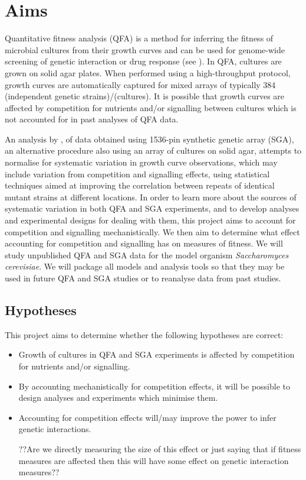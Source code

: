 
\section{Aims}
\label{sec:aims}
Quantitative fitness analysis (QFA) is a method for inferring the
fitness of microbial cultures from their growth curves and can be used
for genome-wide screening of genetic interaction or drug response (see
\citet{Addinall2008,Addinall2011,Lawless2010,Banks2012,Andrew2013}). In QFA, cultures are grown on solid agar plates. When performed
using a high-throughput protocol, growth curves are automatically
captured for mixed arrays of typically 384 (independent genetic
strains)/(cultures). It is possible that growth curves are affected by
competition for nutrients and/or signalling between cultures which is
not accounted for in past analyses of QFA data.

An analysis by \citet{Baryshnikova2010}, of data obtained using
1536-pin synthetic genetic array (SGA), an alternative procedure also
using an array of cultures on solid agar, attempts to normalise for
systematic variation in growth curve observations, which may include
variation from competition and signalling effects, using statistical
techniques aimed at improving the correlation between repeats of
identical mutant strains at different locations. In order to learn
more about the sources of systematic variation in both QFA and SGA
experiments, and to develop analyses and experimental designs for
dealing with them, this project aims to account for competition and
signalling mechanistically. We then aim to determine what effect
accounting for competition and signalling has on measures of
fitness. We will study unpublished QFA and SGA data for the model
organism \textit{Saccharomyces cerevisiae}. We will package all models
and analysis tools so that they may be used in future QFA and SGA
studies or to reanalyse data from past studies.

\subsection{Hypotheses}
This project aims to determine whether
the following hypotheses are correct:
\begin{itemize}
\item %
  Growth of cultures in QFA and SGA experiments is affected by
  competition for nutrients and/or signalling.
\item By accounting mechanistically for competition effects, it will
  be possible to design analyses and experiments which minimise them.
\item Accounting for competition effects will/may improve the power to
  infer genetic interactions.

  ??Are we directly measuring the size of this effect or just saying
  that if fitness measures are affected then this will have some
  effect on genetic interaction measures??
\end{itemize}

